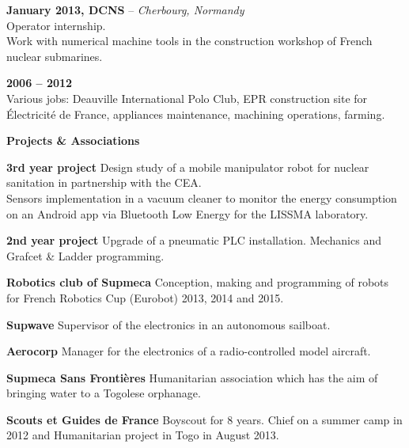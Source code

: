 \documentclass[a4paper,11pt,final]{memoir}
\newcommand{\Sep}{\vspace{1.5em}}
\newcommand{\SmallSep}{\vspace{0.5em}}
\newcommand{\CVSection}[1]
	{\Large\textbf{#1}\par
	\SmallSep\normalsize\normalfont}
\newcommand{\CVItem}[2]
	{\textbf{\color{RoyalBlue} #1 \color{dark_gray} #2}\normalsize\normalfont}
\newcommand{\city}[1]
	{{\small\color{dark_gray}\emph{#1}}\normalsize\normalfont}
\begin{document}
\CVItem{January 2013,}{DCNS} -- \city{Cherbourg, Normandy}\\
Operator internship.\\
Work with numerical machine tools in the construction workshop of French nuclear
submarines.
\SmallSep

\CVItem{2006 -- 2012}{}\\
Various jobs: Deauville International Polo Club, EPR construction site for Électricité de France, appliances maintenance, machining operations, farming.
\Sep

\CVSection{Projects \& Associations}
\CVItem{3rd year project}{}Design study of a mobile manipulator robot for nuclear sanitation in partnership with the CEA.\\
Sensors implementation in a vacuum cleaner to monitor the energy consumption on an Android app via Bluetooth Low Energy for the LISSMA laboratory.\SmallSep

\CVItem{2nd year project}{}Upgrade of a pneumatic PLC installation. Mechanics and Grafcet \& Ladder programming.
\SmallSep

\CVItem{Robotics club of Supmeca}{}Conception, making and programming of robots for French Robotics Cup (Eurobot) 2013, 2014 and 2015.
\SmallSep

\CVItem{Supwave}{}Supervisor of the electronics in an autonomous sailboat.
\SmallSep

\CVItem{Aerocorp}{}Manager for the electronics of a radio-controlled model aircraft.\SmallSep

\CVItem{Supmeca Sans Frontières}{}Humanitarian association which has the aim of bringing water to a Togolese orphanage.
\SmallSep

\CVItem{Scouts et Guides de France}{}Boyscout for 8 years.
Chief on a summer camp in 2012 and Humanitarian project in Togo in August 2013.

\end{document}
